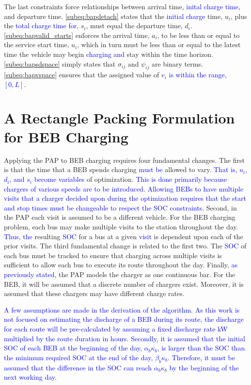 \documentclass[utf8]{FrontiersinHarvard}
\begin{document}
The last constraints force relationships between arrival time, \textcolor{blue}{inital charge time}, and
departure time. \autoref{subeq:bapdetach} states that the \textcolor{blue}{ initial charge} time, \(u_i\), plus
the \textcolor{blue}{total charge time for}, \(s_i\), must equal the departure time, \(d_i\).
\autoref{subeq:bapvalid_starts} enforces the arrival time, \(a_i\), to be less than or equal to the service start time,
\(u_i\), which in turn must be less than or equal to the latest time the vehicle may begin
\textcolor{blue}{charging and} stay within the time horizon. \autoref{subeq:bapsdspace} simply states that
\(\sigma_{ij}\) and \(\psi_{ij}\) are binary terms. \autoref{subeq:bapvspace} ensures that the assigned value of \(v_i\)
\textcolor{blue}{is within the range, $[0,L]$}.
\section{A Rectangle Packing Formulation for BEB Charging}
\label{sec:problemformulation}
Applying the PAP to BEB charging requires four fundamental changes. The first is that the time that a BEB spends
charging \textcolor{blue}{must be} allowed to vary. \textcolor{blue}{That is, $u_i$, $d_i$, and $s_i$ become variables} of optimization. \textcolor{blue}{This is done primarily because chargers of various speeds are to be introduced. Allowing BEBs to have multiple visits that a charger decided upon during the optimization requires that the start and stop times must be changeable to respect the SOC constraints.} Second, in the PAP each
visit is assumed to be a different vehicle. For the BEB charging problem, each bus may make multiple visits to the
station throughout the day\textcolor{blue}{. Thus, the} resulting \textcolor{blue}{SOC} for a bus at a given
\textcolor{blue}{visit} is dependent upon each of the prior visits. The third fundamental change is related
to the first two. The \textcolor{blue}{SOC} of each bus must be tracked to ensure that charging across
multiple visits is sufficient to allow each bus to execute its route throughout the day. Finally,
\textcolor{blue}{as previously stated}, the PAP models the charger as one continuous bar. For the BEB, it
will be assumed that a discrete number of chargers exist. Moreover, it is assumed that these chargers may have different
charge rates.

\textcolor{blue}{A few assumptions are made in the derivation of the algorithm. As this work is not focused on
  estimating the discharge of a BEB during its route, the discharge for each route will be pre-calculated by assuming a
  fixed discharge rate kW multiplied by the route duration in hours. Secondly, it is assumed that the initial SOC of
  each BEB at the beginning of the day, $\alpha_b\kappa_b$, is larger than the SOC than the minimum required SOC at the
  end of the day, $\beta_b\kappa_b$. Therefore, it must be assumed that the difference in the SOC can reach
  $\alpha_b\kappa_b$ by the beginning of the next working day.}
\end{document}
